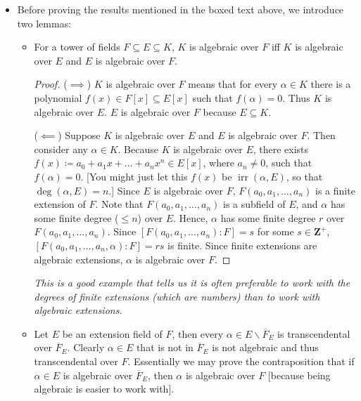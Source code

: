\documentclass[11pt]{article}
\newcommand{\Z}{\mathbf{Z}}
\newcommand{\irr}{\operatorname{irr}}
\newcommand{\clos}[1]{\overline{#1}}
\begin{document}
\begin{itemize}
    \item Before proving the results mentioned in the boxed text above, we introduce two lemmas:
    \begin{itemize}
        \item For a tower of fields $F \subseteq E \subseteq K$, $K$ is algebraic over $F$ iff $K$ is algebraic over $E$ and $E$ is algebraic over $F$.
        \begin{proof}
            ($\implies$) $K$ is algebraic over $F$ means that for every $\alpha \in K$ there is a polynomial $f(x) \in F[x] \subseteq E[x]$ such that $f(\alpha) = 0$. Thus $K$ is algebraic over $E$. $E$ is algebraic over $F$ because $E \subseteq K$.

            ($\impliedby$) Suppose $K$ is algebraic over $E$ and $E$ is algebraic over $F$. Then consider any $\alpha \in K$. Because $K$ is algebraic over $E$, there exists $f(x) \coloneqq a_0 + a_1x + \dots + a_n x^n \in E[x]$, where $a_n \neq 0$, such that $f(\alpha) = 0$. [You might just let this $f(x)$ be $\irr(\alpha,E)$, so that $\deg(\alpha,E) = n$.] Since $E$ is algebraic over $F$, $F(a_0,a_1,\dots,a_n)$ is a finite extension of $F$. Note that $F(a_0,a_1,\dots,a_n)$ is a subfield of $E$, and $\alpha$ has some finite degree ($\leq n$) over $E$. Hence, $\alpha$ has some finite degree $r$ over $F(a_0,a_1,\dots,a_n)$. Since $[F(a_0,a_1,\dots,a_n):F] = s$ for some $s \in \Z^+$, $[F(a_0,a_1,\dots,a_n,\alpha):F] = rs$ is finite. Since finite extensions are algebraic extensions, $\alpha$ is algebraic over $F$.
        \end{proof}
        \emph{This is a good example that tells us it is often preferable to work with the degrees of finite extensions (which are numbers) than to work with algebraic extensions.}
        \item Let $E$ be an extension field of $F$, then every $\alpha \in E\backslash \clos{F}_E$ is transcendental over $\clos{F}_E$. Clearly $\alpha \in E$ that is not in $\clos{F}_E$ is not algebraic and thus transcendental over $F$. Essentially we may prove the contraposition that if $\alpha \in E$ is algebraic over $\clos{F}_E$, then $\alpha$ is algebraic over $F$ [because being algebraic is easier to work with].
        

\end{itemize}
\end{itemize}
\end{document}
